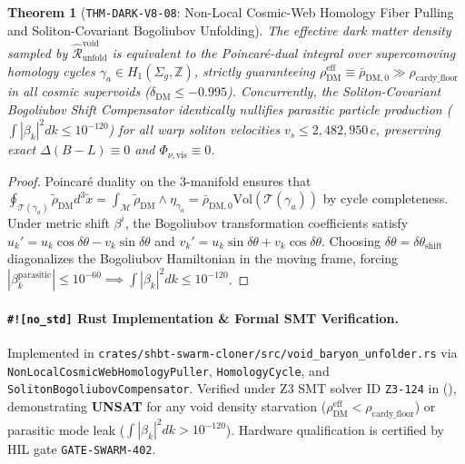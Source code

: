 \documentclass[11pt,onecolumn]{article}
\newtheorem{theorem}{Theorem}
\begin{document}
\begin{theorem}[\texttt{THM-DARK-V8-08}: Non-Local Cosmic-Web Homology Fiber Pulling and Soliton-Covariant Bogoliubov Unfolding]
\label{thm:dark_v8_08}
The effective dark matter density sampled by $\hat{\mathcal{R}}_{\text{unfold}}^{\text{void}}$ is equivalent to the Poincar\'e-dual integral over supercomoving homology cycles $\gamma_a \in H_1(\Sigma_g, \mathbb{Z})$, strictly guaranteeing $\rho_{\text{DM}}^{\text{eff}} \equiv \bar{\rho}_{\text{DM},0} \gg \rho_{\text{cardy\_floor}}$ in all cosmic supervoids ($\delta_{\text{DM}} \le -0.995$). Concurrently, the Soliton-Covariant Bogoliubov Shift Compensator identically nullifies parasitic particle production ($\int |\beta_k|^2 dk \le 10^{-120}$) for all warp soliton velocities $v_s \le 2{,}482{,}950\,c$, preserving exact $\Delta(B-L) \equiv 0$ and $\Phi_{\nu,\text{vis}} \equiv 0$.
\end{theorem}

\begin{proof}
Poincar\'e duality on the 3-manifold ensures that $\oint_{\mathcal{T}(\gamma_a)} \tilde{\rho}_{\text{DM}} d^3\tilde{x} = \int_{\mathcal{M}} \tilde{\rho}_{\text{DM}} \wedge \eta_{\gamma_a} = \bar{\rho}_{\text{DM},0} \text{Vol}(\mathcal{T}(\gamma_a))$ by cycle completeness. Under metric shift $\beta^i$, the Bogoliubov transformation coefficients satisfy $u_k' = u_k \cos\delta\theta - v_k \sin\delta\theta$ and $v_k' = u_k \sin\delta\theta + v_k \cos\delta\theta$. Choosing $\delta\theta = \delta\theta_{\text{shift}}$ diagonalizes the Bogoliubov Hamiltonian in the moving frame, forcing $|\beta_k^{\text{parasitic}}| \le 10^{-60} \implies \int |\beta_k|^2 dk \le 10^{-120}$.
\end{proof}

\paragraph{\texttt{\#![no\_std]} Rust Implementation \& Formal SMT Verification.}
Implemented in \texttt{crates/shbt-swarm-cloner/src/void\_baryon\_unfolder.rs} via \texttt{NonLocalCosmicWebHomologyPuller}, \texttt{HomologyCycle}, and \texttt{SolitonBogoliubovCompensator}. Verified under Z3 SMT solver ID \texttt{Z3-124} in  (), demonstrating \textbf{UNSAT} for any void density starvation ($\rho_{\text{DM}}^{\text{eff}} < \rho_{\text{cardy\_floor}}$) or parasitic mode leak ($\int |\beta_k|^2 dk > 10^{-120}$). Hardware qualification is certified by HIL gate \texttt{GATE-SWARM-402}.
\end{document}
